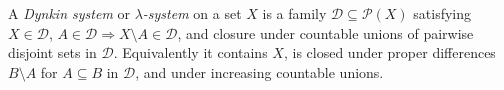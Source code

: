 
A \emph{Dynkin system} or \emph{$\lambda$-system} on a set $X$ is a family $\mathcal D\subseteq\mathcal P(X)$ satisfying $X\in\mathcal D$, $A\in\mathcal D\Rightarrow X\setminus A\in\mathcal D$, and closure under countable unions of pairwise disjoint sets in $\mathcal D$. Equivalently it contains $X$, is closed under proper differences $B\setminus A$ for $A\subseteq B$ in $\mathcal D$, and under increasing countable unions.
